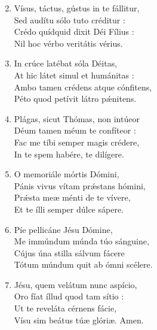 \begin{enumerate}
  \setcounter{enumi}{1}
  \item Vísus, táctus, gústus in te fállitur, \\
    Sed audítu sólo tuto créditur : \\
    Crédo quídquid dixit Déi Fílius : \\
    Nil hoc vérbo veritátis vérius.
  \item In crúce latébat sóla Déitas, \\
    At hic látet simul et humánitas : \\
    Ambo tamen crédens atque cónfitens, \\
    Péto quod petívit látro pǽnitens.
  \item Plágas, sicut Thómas, non intúeor \\
    Déum tamen méum te confíteor : \\
    Fac me tíbi semper magis crédere, \\
    In te spem habére, te dilígere.
  \item O memoriále mórtis Dómini, \\
    Pánis vivus vítam prǽstans hómini, \\
    Prǽsta meæ ménti de te vívere, \\
    Et te ílli semper dúlce sápere.
  \item Píe pellicáne Jésu Dómine, \\
    Me immúndum múnda túo sánguine, \\
    Cújus úna stilla sálvum fácere \\
    Tótum múndum quit ab ómni scélere.
  \item Jésu, quem velátum nunc aspício, \\
    Oro fíat íllud quod tam sítio : \\
    Ut te reveláta cérnens fácie, \\
    Vísu sim beátus túæ glóriæ. Amen.
\end{enumerate}
